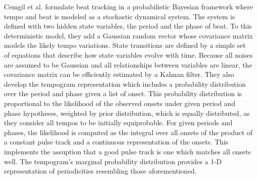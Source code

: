 \documentclass{scrartcl}
\begin{document}


Cemgil et al. \cite{Cemgil2001} formulate beat tracking in a probabilistic Bayesian framework where tempo and beat is modeled as a stochastic dynamical system. The system is defined with two hidden state variables, the period and the phase of beat. To this deterministic model, they add a Gaussian random vector whose covariance matrix models the likely tempo variations. State transitions are defined by a simple set of equations that describe how state variables evolve with time. 
Because all noises are assumed to be Gaussian and all relationships between variables are linear, the covariance matrix can be efficiently estimated by a Kalman filter. They also develop the tempogram representation which includes a probability distribution over the period and phase given a list of onset. This probability distribution is proportional to the likelihood of the observed onsets under given period and phase hypotheses, weighted by prior distribution, which is equally distributed, as they consider all tempos to be initially equiprobable. For given periods and phases, the likelihood is computed as the integral over all onsets of the product of a constant pulse track and a continuous representation of the onsets. This implements the assuption that a good pulse track is one which matches all onsets well. The tempogram's marginal probability distribution provides a 1-D representation of periodicities resembling those aforementioned. 
\end{document}
